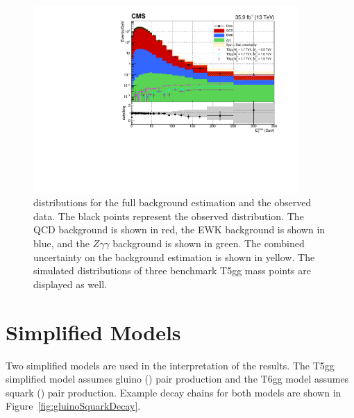 \begin{figure}[h]
\begin{center}
\includegraphics[width=0.9\textwidth]{Figures/Results/finalPlot.pdf}
\end{center}
\caption{\ETmiss distributions for the full background estimation and the observed data. The black points represent the observed \ETmiss distribution. 
The QCD background is shown in red, the EWK background
is shown in blue, and the $Z\gamma\gamma$ background is shown in green. 
The combined uncertainty on the background estimation is shown in yellow.
The simulated \ETmiss distributions of three benchmark T5gg mass points are displayed as well.}
\label{fig:FinalPlot}
\end{figure}


\section{Simplified Models}
\label{sec:SimplifiedModels}

Two simplified models are used in the interpretation of the results. The T5gg simplified model assumes gluino (\gluino) pair production and the T6gg model assumes squark (\squark) pair production. Example decay chains for both models are shown in Figure~\ref{fig:gluinoSquarkDecay}.

